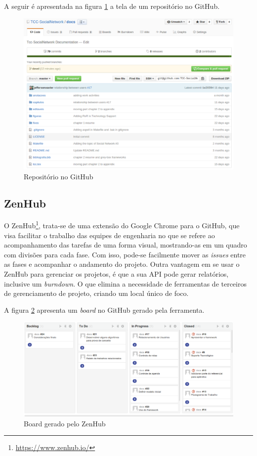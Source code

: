 A seguir é apresentada na figura \ref{github} a tela de um repositório no GitHub.

\begin{figure}[!h]
	\centering
	\includegraphics[scale=0.35]{figuras/capitulo3/github.eps}
	\caption{Repositório no GitHub}
	\label{github}
\end{figure}

\subsection{ZenHub}

O ZenHub\footnote{\url{https://www.zenhub.io/}}, trata-se de uma extensão do Google Chrome para o GitHub, que visa facilitar o trabalho das equipes de engenharia no que se refere ao acompanhamento das tarefas de uma forma visual, mostrando-as em um quadro com divisões para cada fase. Com isso, pode-se facilmente mover as \textit{issues} entre as fases e acompanhar o andamento do projeto. Outra vantagem em se usar o ZenHub para gerenciar os projetos, é que a sua API pode gerar relatórios, inclusive um \textit{burndown}. O que elimina a necessidade de ferramentas de terceiros de gerenciamento de projeto, criando um local único de foco.

A figura \ref{zenhub} apresenta um \textit{board} no GitHub gerado pela ferramenta.

\begin{figure}[!h]
	\centering
	\includegraphics[scale=0.3]{figuras/capitulo3/zenhub.eps}
	\caption{Board gerado pelo ZenHub}
	\label{zenhub}
\end{figure}

